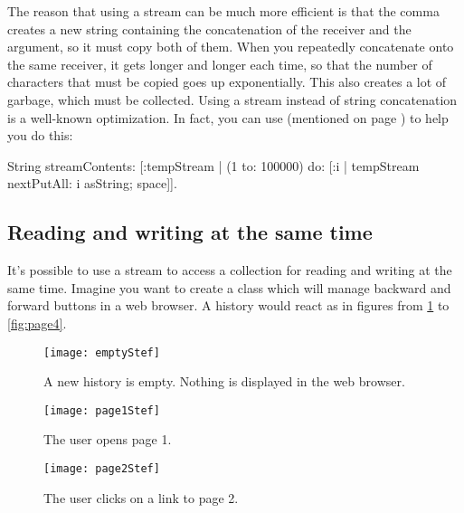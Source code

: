 \documentclass[a4paper,10pt,twoside]{book}
\begin{document}
The reason that using a stream can be much more efficient is that the comma creates a new string containing the concatenation of the receiver and the argument, so it must copy both of them.
When you repeatedly concatenate onto the same receiver, it gets longer and longer each time, so that the number of characters that must be copied goes up exponentially.
This also creates a lot of garbage, which must be collected.
Using a stream instead of string concatenation is a well-known optimization.
In fact, you can use  (mentioned on page \pageref{sec:streamContents}) to help you do this:

\begin{code}{}
String streamContents: [:tempStream |
  (1 to: 100000) do: [:i | 
    tempStream nextPutAll: i asString; space]].
\end{code}

\subsection{Reading and writing at the same time}

It's possible to use a stream to access a collection for reading and writing at the same time.
Imagine you want to create a  class which will manage backward and forward buttons in a web browser.
A history would react as in figures from \ref{fig:emptyStream} to \ref{fig:page4}.

\begin{figure}[!ht]
\centerline{\texttt{[image: emptyStef]}}
\caption{A new history is empty. Nothing is displayed in the web browser.}
\label{fig:emptyStream}
\vspace{.2in}
\end{figure}

\begin{figure}[!ht]
\centerline{\texttt{[image: page1Stef]}}
\caption{The user opens page 1.}
\label{fig:page1}
\vspace{.2in}
\end{figure}

\begin{figure}[!ht]
\centerline{\texttt{[image: page2Stef]}}
\caption{The user clicks on a link to page 2.}
\label{fig:page2}
\vspace{.2in}
\end{figure}
\end{document}
